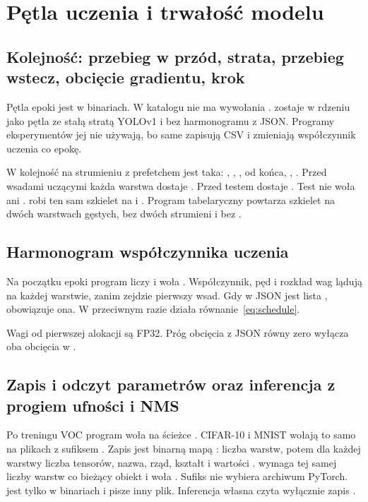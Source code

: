 \section{Pętla uczenia i trwałość modelu}

\subsection{Kolejność: przebieg w przód, strata, przebieg wstecz, obcięcie gradientu, krok}

Pętla epoki jest w binariach. W katalogu  nie ma wywołania .  zostaje w rdzeniu jako pętla ze stałą stratą YOLOv1 i bez harmonogramu z JSON. Programy eksperymentów jej nie używają, bo same zapisują CSV i zmieniają współczynnik uczenia co epokę.

W  kolejność na strumieniu z prefetchem jest taka: , , ,  od końca, , . Przed wsadami uczącymi każda warstwa dostaje . Przed testem dostaje . Test nie woła  ani .  robi ten sam szkielet na  i . Program tabelaryczny powtarza szkielet na dwóch warstwach gęstych, bez dwóch strumieni i bez .

\subsection{Harmonogram współczynnika uczenia}

Na początku epoki program liczy  i woła . Współczynnik, pęd i rozkład wag lądują na każdej warstwie, zanim zejdzie pierwszy wsad. Gdy w JSON jest lista , obowiązuje ona. W przeciwnym razie działa równanie~\eqref{eq:schedule}.

Wagi od pierwszej alokacji są FP32. Próg obcięcia z JSON równy zero wyłącza oba obcięcia w .

\subsection{Zapis i odczyt parametrów oraz inferencja z progiem ufności i NMS}

Po treningu VOC program woła  na ścieżce . CIFAR-10 i MNIST wołają to samo  na plikach z sufiksem . Zapis jest binarną mapą : liczba warstw, potem dla każdej warstwy liczba tensorów, nazwa, rząd, kształt i wartości .  wymaga tej samej liczby warstw co bieżący obiekt i woła . Sufiks  nie wybiera archiwum PyTorch.  jest tylko w binariach  i pisze inny plik. Inferencja własna czyta wyłącznie zapis .

